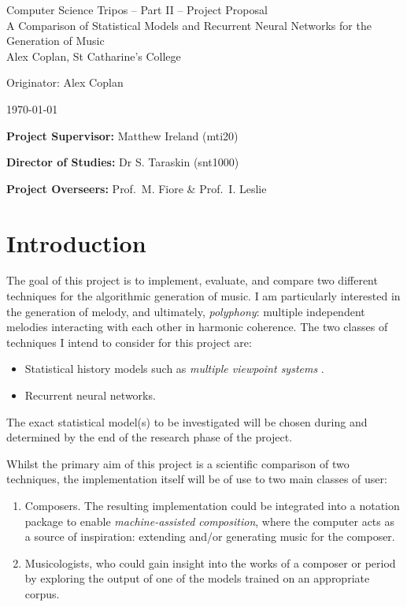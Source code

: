 \documentclass[12pt,a4paper,twoside]{article}
\begin{document}
\cleanlookdateon

\begin{center}
\Large
Computer Science Tripos -- Part II -- Project Proposal\\[4mm]
\LARGE
A Comparison of Statistical Models and Recurrent Neural Networks for the
Generation of Music\\[4mm]

\large
Alex Coplan, St Catharine's College

Originator: Alex Coplan

\today
\end{center}

\vspace{5mm}

\textbf{Project Supervisor:} Matthew Ireland (mti20)

\textbf{Director of Studies:} Dr S. Taraskin (snt1000)

\textbf{Project Overseers:} Prof.\ M. Fiore \& Prof.\ I. Leslie

\section{Introduction}

The goal of this project is to implement, evaluate, and compare two different
techniques for the algorithmic generation of music. I am particularly interested
in the generation of melody, and ultimately, \emph{polyphony}: multiple
independent melodies interacting with each other in harmonic coherence.  The two
classes of techniques I intend to consider for this project are:
\begin{itemize}[itemsep=0mm]
	\item Statistical history models such as \emph{multiple viewpoint
			systems} \cite{conklin1995viewpoints}.
	\item Recurrent neural networks.
\end{itemize}

The exact statistical model(s) to be investigated will be chosen during and
determined by the end of the research phase of the project.

Whilst the primary aim of this project is a scientific comparison of two
techniques, the implementation itself will be of use to two main classes of
user:
\begin{enumerate}
  \item Composers. The resulting implementation could be integrated into a
    notation package to enable \emph{machine-assisted composition}, where the
    computer acts as a source of inspiration: extending and/or
    generating music for the composer.
  \item Musicologists, who could gain insight into the works of a composer or
    period by exploring the output of one of the models trained on an
    appropriate corpus.
    
\end{enumerate}
\end{document}
